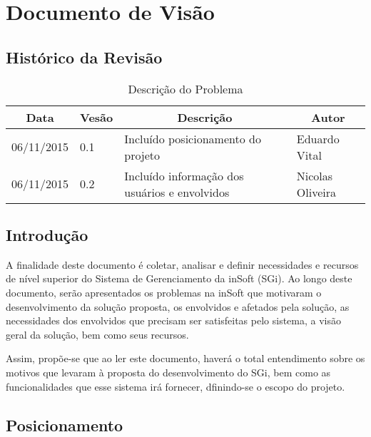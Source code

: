 \chapter{Documento de Visão}
\label{sec:art-visao}
  \section{Histórico da Revisão}

  \begin{table}[H]
    \centering
    \begin{tabular}{|l|l|l|l|}
      \hline
      \multicolumn{1}{|c|}{Data} & \multicolumn{1}{c|}{Vesão} & \multicolumn{1}{c|}{Descrição}     & \multicolumn{1}{c|}{Autor} \\ \hline
      06/11/2015                & 0.1                         & Incluído posicionamento do projeto & Eduardo Vital       \\ \hline
      06/11/2015                & 0.2                         & Incluído informação dos usuários e envolvidos & Nicolas  Oliveira
        \\ \hline
    \end{tabular}
    \caption{Descrição do Problema}
  \end{table}

  \section{Introdução}

    A finalidade deste documento é coletar, analisar e definir necessidades e recursos de nível superior do Sistema de Gerenciamento da inSoft (SGi). Ao longo deste documento, serão apresentados os problemas na inSoft que motivaram o desenvolvimento da solução proposta, os envolvidos e afetados pela solução, as necessidades dos envolvidos que precisam ser satisfeitas pelo sistema, a visão geral da solução, bem como seus recursos.

    Assim, propõe-se que ao ler este documento, haverá o total entendimento sobre os motivos que levaram à proposta do desenvolvimento do SGi, bem como as funcionalidades que esse sistema irá fornecer, dfinindo-se o escopo do projeto.


  \section{Posicionamento}
